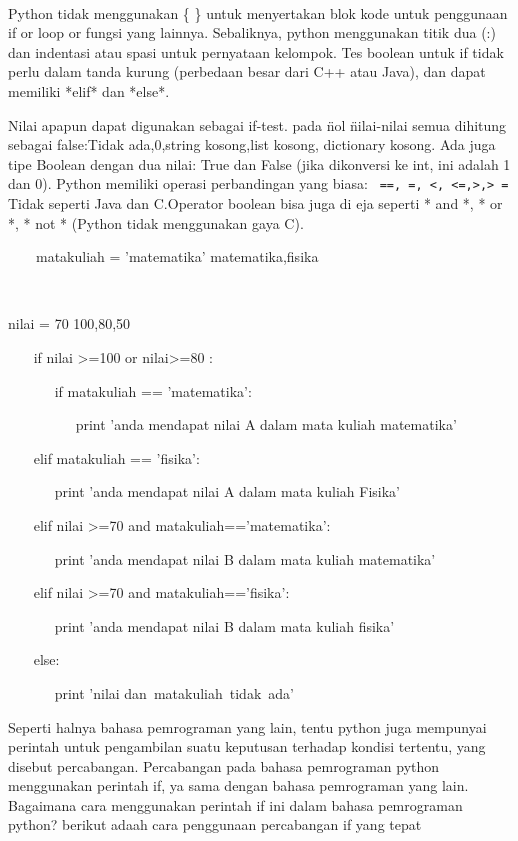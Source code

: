 ~~~  

 
  Python tidak menggunakan  \{   \}  untuk menyertakan blok kode untuk penggunaan if or loop or fungsi yang lainnya. Sebaliknya, python menggunakan titik dua (:) dan indentasi atau spasi untuk pernyataan  kelompok. Tes  boolean untuk if tidak perlu dalam tanda kurung (perbedaan besar dari C++ atau Java), dan dapat memiliki *elif* dan *else*. 
 

            Nilai apapun dapat digunakan sebagai if-test.
			pada   \" nol  \"  nilai-nilai semua dihitung sebagai false:Tidak ada,0,string kosong,list kosong, dictionary kosong.
			Ada juga tipe Boolean dengan dua nilai: True dan False (jika dikonversi ke int, ini adalah 1 dan 0). 
			Python memiliki operasi perbandingan yang biasa: \verb| ==, =, <, <=,>,> =| 
			Tidak seperti Java dan C.Operator boolean bisa juga di eja seperti * and *, * or *, * not * (Python tidak menggunakan gaya C). 

 
~~~~matakuliah = 'matematika'   matematika,fisika 
 
~~  
 
 nilai = 70 100,80,50 

 
~~~ if nilai >=100 or nilai>=80 : 

 
~~~~~~ if matakuliah == 'matematika': 

 
~~~~~~~~~ print 'anda mendapat nilai A dalam mata kuliah matematika' 

 
~~~ elif matakuliah == 'fisika': 

 
~~~~~~ print 'anda mendapat nilai A dalam mata kuliah Fisika' 

 
~~~ elif nilai >=70 and matakuliah=='matematika': 


 
~~~~~~ print 'anda mendapat nilai B dalam mata kuliah matematika' 

 
~~~ elif nilai >=70 and matakuliah=='fisika': 

 
~~~~~~ print 'anda mendapat nilai B dalam mata kuliah fisika' 

 
~~~ else: 

 
~~~~~~ print 'nilai dan~matakuliah~tidak~ada'~~~     

 
Seperti halnya bahasa pemrograman yang lain, tentu python juga mempunyai perintah untuk pengambilan suatu keputusan terhadap kondisi tertentu, yang disebut percabangan. Percabangan pada bahasa pemrograman python menggunakan perintah if, ya sama dengan bahasa pemrograman yang lain. Bagaimana cara menggunakan perintah if ini dalam bahasa pemrograman python? berikut adaah cara penggunaan percabangan if yang tepat
 

